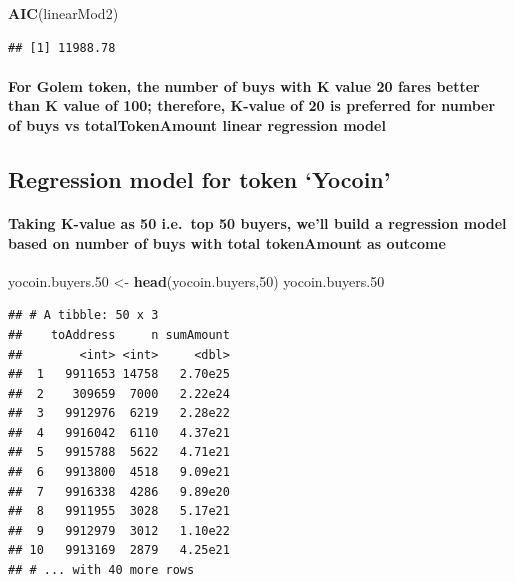 \documentclass[]{article}
\newenvironment{Shaded}{\begin{snugshade}}{\end{snugshade}}
\newcommand{\KeywordTok}[1]{\textcolor[rgb]{0.13,0.29,0.53}{\textbf{#1}}}
\newcommand{\DecValTok}[1]{\textcolor[rgb]{0.00,0.00,0.81}{#1}}
\newcommand{\StringTok}[1]{\textcolor[rgb]{0.31,0.60,0.02}{#1}}
\newcommand{\NormalTok}[1]{#1}
\let\oldparagraph\paragraph
\renewcommand{\paragraph}[1]{\oldparagraph{#1}\mbox{}}
\begin{document}
\begin{Shaded}
\begin{Highlighting}[]
\KeywordTok{AIC}\NormalTok{(linearMod2)}
\end{Highlighting}
\end{Shaded}

\begin{verbatim}
## [1] 11988.78
\end{verbatim}

\paragraph{For Golem token, the number of buys with K value 20 fares
better than K value of 100; therefore, K-value of 20 is preferred for
number of buys vs totalTokenAmount linear regression
model}\label{for-golem-token-the-number-of-buys-with-k-value-20-fares-better-than-k-value-of-100-therefore-k-value-of-20-is-preferred-for-number-of-buys-vs-totaltokenamount-linear-regression-model}

\subsection{\texorpdfstring{Regression model for token
`Yocoin'}{Regression model for token Yocoin}}\label{regression-model-for-token-yocoin}

\paragraph{Taking K-value as 50 i.e.~top 50 buyers, we'll build a
regression model based on number of buys with total tokenAmount as
outcome}\label{taking-k-value-as-50-i.e.top-50-buyers-well-build-a-regression-model-based-on-number-of-buys-with-total-tokenamount-as-outcome}

\begin{Shaded}
\begin{Highlighting}[]
\NormalTok{yocoin.buyers.}\DecValTok{50}\NormalTok{ <-}\StringTok{ }\KeywordTok{head}\NormalTok{(yocoin.buyers,}\DecValTok{50}\NormalTok{)}
\NormalTok{yocoin.buyers.}\DecValTok{50}
\end{Highlighting}
\end{Shaded}

\begin{verbatim}
## # A tibble: 50 x 3
##    toAddress     n sumAmount
##        <int> <int>     <dbl>
##  1   9911653 14758   2.70e25
##  2    309659  7000   2.22e24
##  3   9912976  6219   2.28e22
##  4   9916042  6110   4.37e21
##  5   9915788  5622   4.71e21
##  6   9913800  4518   9.09e21
##  7   9916338  4286   9.89e20
##  8   9911955  3028   5.17e21
##  9   9912979  3012   1.10e22
## 10   9913169  2879   4.25e21
## # ... with 40 more rows
\end{verbatim}
\end{document}
